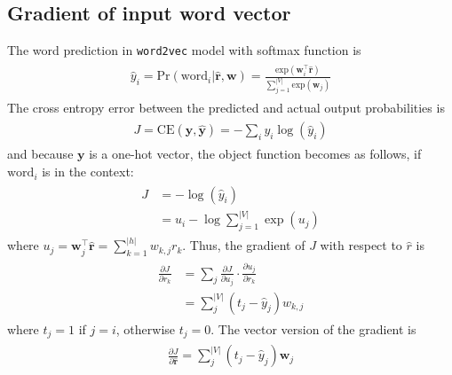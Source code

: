 \documentclass[paper=a4, fontsize=11pt]{scrartcl} %
\numberwithin{equation}{section} %
\numberwithin{figure}{section} %
\numberwithin{table}{section} %
\begin{document}
\subsection{Gradient of input word vector}
The word prediction in \texttt{word2vec} model with softmax function is 
\begin{align} 
\begin{split}
	\hat{y}_{i} = \mbox{Pr}(\mbox{word}_{i}|\hat{\boldsymbol{r}}, \boldsymbol{w}) = \frac{\mbox{exp}(\boldsymbol{w}_{i}^\intercal \hat{\boldsymbol{r}})}{\sum_{j=1}^{|V|}\mbox{exp}(\boldsymbol{w}_{j})}
\end{split}					
\end{align}
The cross entropy error between the predicted and actual output probabilities is 
\begin{align} 
\begin{split}
	J = \mbox{CE}(\boldsymbol{y}, \hat{\boldsymbol{y}}) = -\sum_{i} y_{i} \log (\hat{y}_{i})
\end{split}					
\end{align}
and because $\boldsymbol{y}$ is a one-hot vector, the object function becomes as follows, if $\mbox{word}_{i}$ is in the context:
\begin{align} 
\begin{split}
	J &= -\log(\hat{y}_{i}) \\
	  &= u_{i} - \log \sum_{j=1}^{|V|} \exp(u_{j})
\end{split}					
\end{align}
where $u_{j} = \boldsymbol{w}_{j}^{\intercal} \hat{\boldsymbol{r}} = \sum_{k=1}^{|h|} w_{k,j} r_{k}$. Thus, the gradient of $J$ with respect to $\hat{r}$ is
\begin{align} 
\begin{split}
	\frac{\partial J}{\partial r_{k}} &= \sum_{j} \frac{\partial J}{\partial u_{j}} \cdot \frac{\partial u_{j}}{\partial r_{k}} \\
	 &= \sum_{j}^{|V|} (t_{j} - \hat{y}_{j}) w_{k,j}
\end{split}					
\end{align}
 where $t_{j}=1$ if $j=i$, otherwise $t_{j}=0$. The vector version of the gradient is 
\begin{align} 
\begin{split}
	\frac{\partial J}{\partial \hat{\boldsymbol{r}}} 
	 =  \sum_{j}^{|V|} (t_{j} - \hat{y}_{j}) \boldsymbol{w}_{j} 
\end{split}					
\end{align}
 
\end{document}
